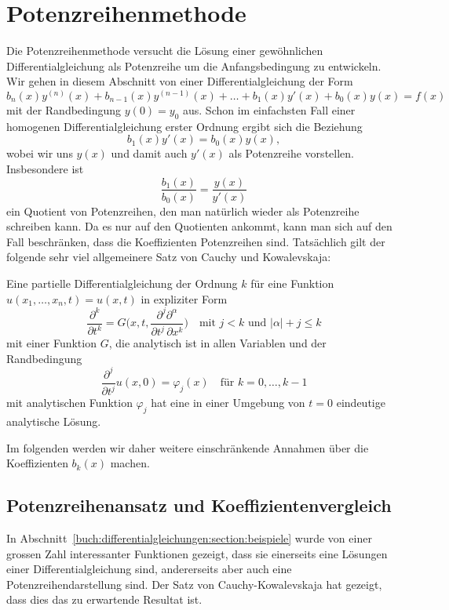 %
%
%
\section{Potenzreihenmethode
\label{buch:differentialgleichungen:section:potenzreihenmethode}}
Die Potenzreihenmethode versucht die Lösung einer gewöhnlichen
Differentialgleichung als Potenzreihe um die Anfangsbedingung zu
entwickeln.
Wir gehen in diesem Abschnitt von einer Differentialgleichung der
Form
\begin{equation}
b_n(x)y^{(n)}(x)
+
b_{n-1}(x)y^{(n-1)}(x)
+
\dots
+
b_1(x)y'(x)
+
b_0(x)y(x)
=
f(x)
\label{buch:differentialgleichungen:eqn:potenzreihendgl}
\end{equation}
mit der Randbedingung $y(0)=y_0$ aus.
Schon im einfachsten Fall einer homogenen Differentialgleichung erster
Ordnung ergibt sich die Beziehung
\[
b_1(x) y'(x) = b_0(x)y(x),
\]
wobei wir uns $y(x)$ und damit auch $y'(x)$ als Potenzreihe vorstellen.
Insbesondere ist 
\[
\frac{b_1(x)}{b_0(x)} = \frac{y(x)}{y'(x)}
\]
ein Quotient von Potenzreihen, den man natürlich wieder als 
Potenzreihe schreiben kann.
Da es nur auf den Quotienten ankommt, kann man sich auf den Fall
beschränken, dass die Koeffizienten Potenzreihen sind.
Tatsächlich gilt der folgende sehr viel allgemeinere Satz von
Cauchy und Kowalevskaja:

\begin{satz}
Eine partielle Differentialgleichung der Ordnung $k$ für eine
Funktion $u(x_1,\dots,x_n,t)=u(x,t)$ 
in expliziter Form
\[
\frac{\partial^k}{\partial t^k}
=
G\biggl(x,t,
\frac{\partial^j\partial^\alpha}{\partial t^j\,\partial x^k}
\biggr)
\quad\text{mit $j<k$ und $|\alpha|+j\le k$}
\]
mit einer Funktion $G$, die analytisch ist in allen Variablen
und der Randbedingung
\[
\frac{\partial^j}{\partial t^j}u(x,0)
=
\varphi_j(x)\quad\text{für $k=0,\dots,k-1$}
\]
mit analytischen Funktion $\varphi_j$ hat eine in einer Umgebung von 
$t=0$ eindeutige analytische Lösung.
\end{satz}

Im folgenden werden wir daher weitere einschränkende Annahmen über
die Koeffizienten $b_k(x)$ machen.

%
%
\subsection{Potenzreihenansatz und Koeffizientenvergleich}
In Abschnitt~\ref{buch:differentialgleichungen:section:beispiele}
wurde von einer grossen Zahl interessanter Funktionen gezeigt, dass
sie einerseits eine Lösungen einer Differentialgleichung sind, 
andererseits aber auch eine Potenzreihendarstellung sind.
Der Satz von Cauchy-Kowalevskaja hat gezeigt, dass dies das zu
erwartende Resultat ist.

